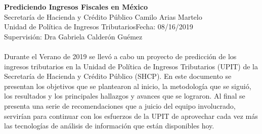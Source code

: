 \documentclass[a4paper, 11pt]{article}
\begin{document}
\noindent
\large\textbf{Prediciendo Ingresos Fiscales en México}\\
\normalsize Secretaría de Hacienda y Crédito Público \hfill Camilo Arias Martelo\\
Unidad de Política de Ingresos Tributarios\hfill Fecha: 08/16/2019 \\
Supervisión: Dra Gabriela Calderón Guémez \\\\

Durante el Verano de 2019 se llevó a cabo un proyecto de predicción de los ingresos tributarios en la Unidad de Política de Ingresos Tributarios (UPIT) de la Secretaría de Hacienda y Crédito Público (SHCP). En este documento se presentan los objetivos que se plantearon al inicio, la metodología que se siguió, los resultados y los principales hallazgos y avances que se lograron. Al final se presenta una serie de recomendaciones que a juicio del equipo involucrado, servirían para continuar con los esfuerzos de la UPIT de aprovechar cada vez más las tecnologías de análisis de información que están disponibles hoy.\\
\end{document}
